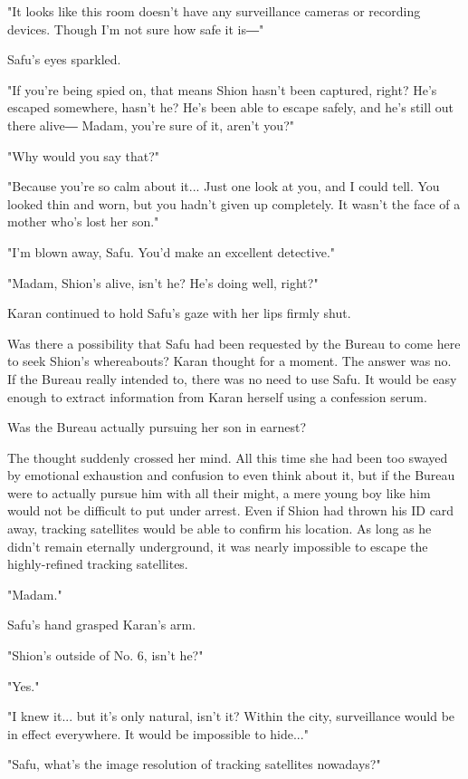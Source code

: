 "It looks like this room doesn't have any surveillance cameras or
recording devices. Though I'm not sure how safe it is―"

Safu's eyes sparkled.

"If you're being spied on, that means Shion hasn't been captured, right?
He's escaped somewhere, hasn't he? He's been able to escape safely, and
he's still out there alive― Madam, you're sure of it, aren't you?"

"Why would you say that?"

"Because you're so calm about it... Just one look at you, and I could
tell. You looked thin and worn, but you hadn't given up completely. It
wasn't the face of a mother who's lost her son."

"I'm blown away, Safu. You'd make an excellent detective."

"Madam, Shion's alive, isn't he? He's doing well, right?"

Karan continued to hold Safu's gaze with her lips firmly shut.

Was there a possibility that Safu had been requested by the Bureau to
come here to seek Shion's whereabouts? Karan thought for a moment. The
answer was no. If the Bureau really intended to, there was no need to
use Safu. It would be easy enough to extract information from Karan
herself using a confession serum.

Was the Bureau actually pursuing her son in earnest?

The thought suddenly crossed her mind. All this time she had been too
swayed by emotional exhaustion and confusion to even think about it, but
if the Bureau were to actually pursue him with all their might, a mere
young boy like him would not be difficult to put under arrest. Even if
Shion had thrown his ID card away, tracking satellites would be able to
confirm his location. As long as he didn't remain eternally underground,
it was nearly impossible to escape the highly-refined tracking
satellites.

"Madam."

Safu's hand grasped Karan's arm.

"Shion's outside of No. 6, isn't he?"

"Yes."

"I knew it... but it's only natural, isn't it? Within the city,
surveillance would be in effect everywhere. It would be impossible to
hide..."

"Safu, what's the image resolution of tracking satellites nowadays?"

